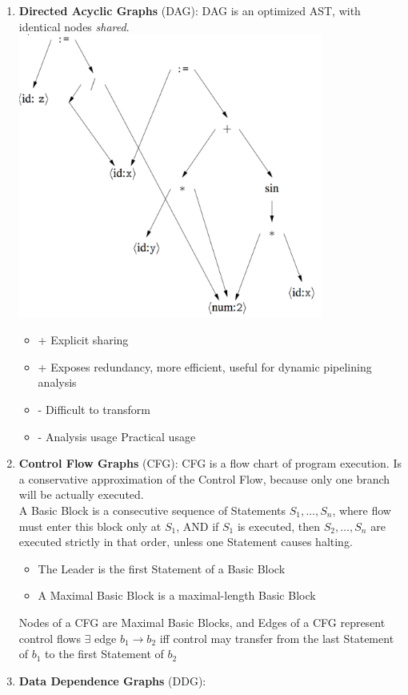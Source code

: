 \documentclass[a4paper]{article}
\theoremstyle{definition}
\begin{document}
\begin{enumerate}
\begin{enumerate}
    \item \textbf{Directed Acyclic Graphs} (DAG): DAG is an optimized AST, with identical nodes \textit{shared}.\\
    \includegraphics[width=10cm]{img/Snipaste_2021-04-19_07-11-03.png}
    \begin{itemize}
      \item + Explicit sharing
      \item + Exposes redundancy, more efficient, useful for dynamic pipelining analysis
      \item - Difficult to transform
      \item - Analysis usage Practical usage
    \end{itemize}
    \item \textbf{Control Flow Graphs} (CFG): CFG is a flow chart of program execution. Is a conservative approximation of the Control Flow, because only one branch will be actually executed.\\
    A Basic Block is a consecutive sequence of Statements $S_{1}, \ldots, S_{n}$, where flow must enter this block only at $S_{1}$, AND if $S_{1}$ is executed, then $S_{2}, \ldots, S_{n}$ are executed strictly in that order, unless one Statement causes halting.

    \begin{itemize}
      \item The Leader is the first Statement of a Basic Block
      \item A Maximal Basic Block is a maximal-length Basic Block
    \end{itemize}
Nodes of a CFG are Maximal Basic Blocks, and Edges of a CFG represent control flows
$\exists$ edge $b_{1} \rightarrow b_{2}$ iff control may transfer from the last Statement of $b_{1}$ to the first Statement of $b_{2}$
    \item \textbf{Data Dependence Graphs} (DDG):
  \end{enumerate}
\end{enumerate}
\end{document}
